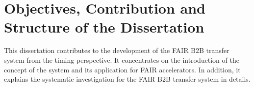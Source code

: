 %
%
%
%

\section{Objectives, Contribution and Structure of the Dissertation}
This dissertation contributes to the development of the FAIR B2B transfer system from the timing perspective. It concentrates on the introduction of the concept of the system and its application for FAIR accelerators. In addition, it explains the systematic investigation for the FAIR B2B transfer system in details.

